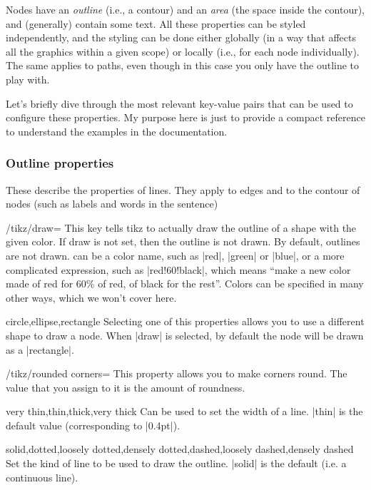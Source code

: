 \documentclass[a4paper]{ltxdoc}
\begin{document}
Nodes have an \emph{outline} (i.e., a contour) and an \emph{area} (the space inside the contour), and (generally) contain some text. All these properties can be styled independently, and the styling can be done either globally (in a way that affects all the graphics within a given scope) or locally (i.e., for each node individually). The same applies to paths, even though in this case you only have the outline to play with.

Let's briefly dive through the most relevant key-value pairs that can be used to configure these properties. My purpose here is just to provide a compact reference to understand the examples in the documentation.

\subsubsection{Outline properties}
These describe the properties of lines. They apply to edges and to the contour of nodes (such as labels and words in the sentence)
\begin{key}{/tikz/draw=}
   This key tells tikz to actually draw the outline of a shape with the given color. If draw is not set, then the outline is not drawn. By default, outlines are not drawn.  can be a color name, such as |red|, |green| or |blue|, or a more complicated expression, such as |red!60!black|, which means ``make a new color made of red for 60\% of red, of black for the rest''. Colors can be specified in many other ways, which we won't cover here.

\end{key}
\begin{keylist}[/tikz]{circle,ellipse,rectangle}
   Selecting one of this properties allows you to use a different shape to draw a node. When |draw| is selected, by default the node will be drawn as a |rectangle|.
\end{keylist}
\begin{key}{/tikz/rounded corners=}
   This property allows you to make corners round. The value that you assign to it is the amount of roundness.
\end{key}
\begin{keylist}[/tikz]{very thin,thin,thick,very thick}
   Can be used to set the width of a line. |thin| is the default value (corresponding to |0.4pt|).
\end{keylist}
\begin{keylist}[/tikz]{solid,dotted,loosely dotted,densely dotted,dashed,loosely dashed,densely dashed}
Set the kind of line to be used to draw the outline. |solid| is the default (i.e. a continuous line).
\end{keylist}
\end{document}
